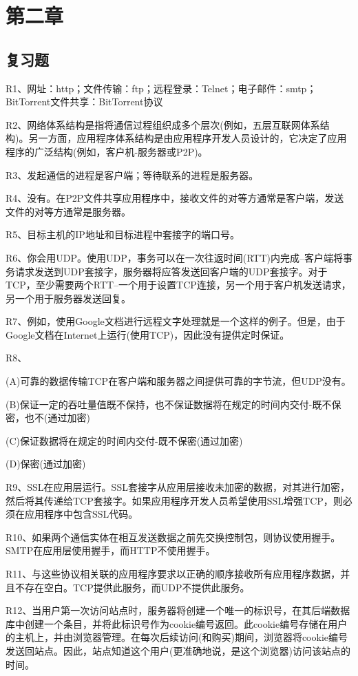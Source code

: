 \documentclass[11pt,UTF8,twoside]{article}
\begin{document}
	\section{第二章 }
	
	\subsection{复习题}
	
	R1、网址：http；文件传输：ftp；远程登录：Telnet；电子邮件：smtp；BitTorrent文件共享：BitTorrent协议
	
	R2、网络体系结构是指将通信过程组织成多个层次(例如，五层互联网体系结构)。另一方面，应用程序体系结构是由应用程序开发人员设计的，它决定了应用程序的广泛结构(例如，客户机-服务器或P2P)。
	
	R3、发起通信的进程是客户端；等待联系的进程是服务器。
	
	R4、没有。在P2P文件共享应用程序中，接收文件的对等方通常是客户端，发送文件的对等方通常是服务器。
	
	R5、目标主机的IP地址和目标进程中套接字的端口号。
	
	R6、你会用UDP。使用UDP，事务可以在一次往返时间(RTT)内完成--客户端将事务请求发送到UDP套接字，服务器将应答发送回客户端的UDP套接字。对于TCP，至少需要两个RTT--一个用于设置TCP连接，另一个用于客户机发送请求，另一个用于服务器发送回复。
	
	R7、例如，使用Google文档进行远程文字处理就是一个这样的例子。但是，由于Google文档在Internet上运行(使用TCP)，因此没有提供定时保证。
	
	R8、
	
	(A)可靠的数据传输TCP在客户端和服务器之间提供可靠的字节流，但UDP没有。
	
	(B)保证一定的吞吐量值既不保持，也不保证数据将在规定的时间内交付-既不保密，也不(通过加密)
	
	(C)保证数据将在规定的时间内交付-既不保密(通过加密)
	
	(D)保密(通过加密)
	
	R9、SSL在应用层运行。SSL套接字从应用层接收未加密的数据，对其进行加密，然后将其传递给TCP套接字。如果应用程序开发人员希望使用SSL增强TCP，则必须在应用程序中包含SSL代码。
	
	R10、如果两个通信实体在相互发送数据之前先交换控制包，则协议使用握手。SMTP在应用层使用握手，而HTTP不使用握手。
	
	R11、与这些协议相关联的应用程序要求以正确的顺序接收所有应用程序数据，并且不存在空白。TCP提供此服务，而UDP不提供此服务。
	
	R12、当用户第一次访问站点时，服务器将创建一个唯一的标识号，在其后端数据库中创建一个条目，并将此标识号作为cookie编号返回。此cookie编号存储在用户的主机上，并由浏览器管理。在每次后续访问(和购买)期间，浏览器将cookie编号发送回站点。因此，站点知道这个用户(更准确地说，是这个浏览器)访问该站点的时间。
	
\end{document}
